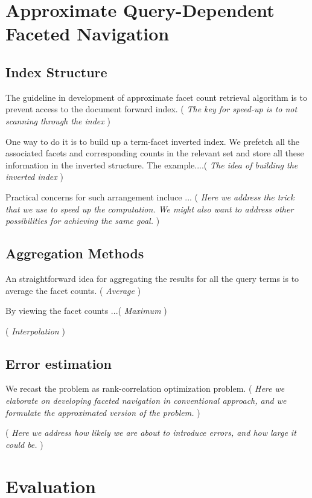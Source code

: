 \section{Approximate Query-Dependent \\Faceted Navigation}

\subsection{Index Structure} 
The guideline in development of approximate facet count retrieval algorithm is
to prevent access to the document forward index.  ({ \it The key for speed-up
is to not scanning through the index })

One way to do it is to build up a term-facet inverted index.  We prefetch all
the associated facets and corresponding counts in the relevant set and store
all these information in the inverted structure.  The example....({ \it The
idea of building the inverted index })

Practical concerns for such arrangement incluce ... ({ \it Here we address
the trick that we use to speed up the computation.  We might also want to
address other possibilities for achieving the same goal. })

\subsection{Aggregation Methods}

An straightforward idea for aggregating the results for all the query terms is
to average the facet counts. ({ \it Average })

By viewing the facet counts ...({ \it Maximum })

({ \it Interpolation })

\subsection{Error estimation} 
We recast the problem as rank-correlation optimization problem.  ({ \it Here we
elaborate on developing faceted navigation in conventional approach, and we
formulate the approximated version of the problem. })

({ \it Here we address how likely we are about to
introduce errors, and how large it could be. })

\section{Evaluation}

